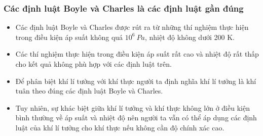 \subsubsection{Các định luật Boyle và Charles là các định luật gần đúng}
\begin{itemize}
	\item Các định luật Boyle và Charles được rút ra từ những thí nghiệm thực hiện trong điều kiện áp suất không quá $10^6\ Pa$, nhiệt độ không dưới 200 K. 
	\item Các thí nghiệm thực hiện trong điều kiện áp suất rất cao và nhiệt độ rất thấp cho kết quả không phù hợp với các định luật trên.
	\item Để phân biệt khí lí tưởng với khí thực người ta định nghĩa khí lí tưởng là khí tuân theo đúng các định luật Boyle và Charles.
	\item Tuy nhiên, sự khác biệt giữa khí lí tưởng và khí thực không lớn ở điều kiện bình thường về áp suất và nhiệt độ nên người ta vẫn có thể áp dụng các định luật của khí lí tưởng cho khí thực nếu không cần độ chính xác cao.
\end{itemize}